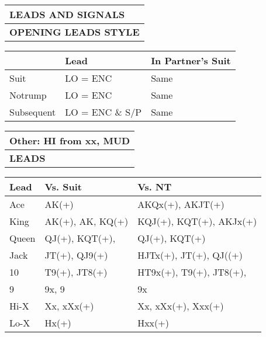 \documentclass{article}
\begin{document}
\begin{minipage}{90mm}
	\begin{tabular}{| p{88mm} |}
		\hline
		\cellcolor{green!25} \textbf{LEADS AND SIGNALS} \\ \hline
		\cellcolor{orange!25}\textbf{OPENING LEADS STYLE} \\ \hline
	\end{tabular}
	\begin{tabular}{| p{15.25mm} | p{32mm} | p{32mm} |}
		& Lead & In Partner's Suit \\ \hline
		Suit & LO = ENC & Same \\ \hline
		Notrump & LO = ENC & Same \\ \hline
		Subsequent & LO = ENC \& S/P & Same \\ \hline
	\end{tabular}
	\begin{tabular}{| p{88mm} |}
		Other: HI from xx, MUD\\ \hline
		\cellcolor{orange!25}\textbf{LEADS} \\ \hline
	\end{tabular}
	\begin{tabular}{| p{15.25mm} | p{32mm} | p{32mm} |}
		Lead & Vs. Suit & Vs. NT \\ \hline
		Ace & AK(+) & AKQx(+), AKJT(+)\\ \hline
		King & AK(+), AK, KQ(+) & KQJ(+), KQT(+), AKJx(+)\\ \hline
		Queen & QJ(+), KQT(+),  & QJ(+), KQT(+)\\ \hline
		Jack & JT(+), QJ9(+) & HJTx(+), JT(+), QJ((+)\\ \hline
		10 & T9(+), JT8(+) & HT9x(+), T9(+), JT8(+),\\ \hline
		9 & 9x, 9 & 9x \\ \hline
		Hi-X & Xx, xXx(+) & Xx, xXx(+), Xxx(+)\\ \hline
		Lo-X & Hx(+) & Hxx(+) \\ \hline
	\end{tabular}
	\begin{tabular}{| p{88mm} |}


\end{tabular}
\end{minipage}
\end{document}
